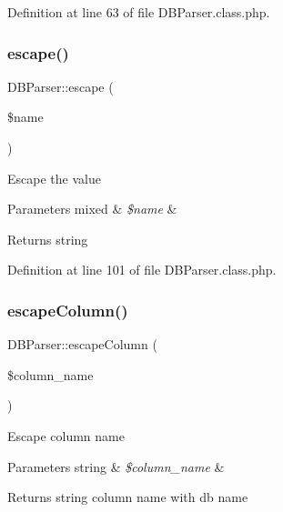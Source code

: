 Definition at line 63 of file D\+B\+Parser.\+class.\+php.

\hypertarget{classDBParser_ac2807a8b1ef18ebf574078e60e1754c6}{}\label{classDBParser_ac2807a8b1ef18ebf574078e60e1754c6} 
\subsubsection{\texorpdfstring{escape()}{escape()}}
{\footnotesize\ttfamily D\+B\+Parser\+::escape (\begin{DoxyParamCaption}\item[{}]{\$name }\end{DoxyParamCaption})}

Escape the value


\begin{DoxyParams}[1]{Parameters}
mixed & {\em \$name} & \\
\hline
\end{DoxyParams}
\begin{DoxyReturn}{Returns}
string 
\end{DoxyReturn}


Definition at line 101 of file D\+B\+Parser.\+class.\+php.

\hypertarget{classDBParser_a21799d785eb817b6df7871b895c91185}{}\label{classDBParser_a21799d785eb817b6df7871b895c91185} 
\subsubsection{\texorpdfstring{escape\+Column()}{escapeColumn()}}
{\footnotesize\ttfamily D\+B\+Parser\+::escape\+Column (\begin{DoxyParamCaption}\item[{}]{\$column\+\_\+name }\end{DoxyParamCaption})}

Escape column name


\begin{DoxyParams}[1]{Parameters}
string & {\em \$column\+\_\+name} & \\
\hline
\end{DoxyParams}
\begin{DoxyReturn}{Returns}
string column name with db name 
\end{DoxyReturn}



